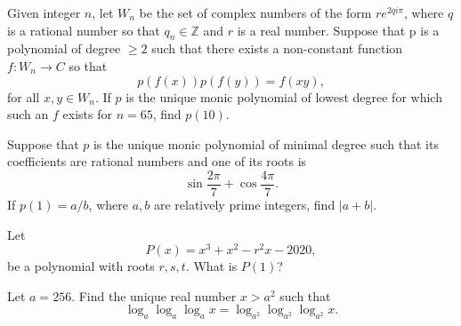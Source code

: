 \begin{question}[name={2020 PUMaC, Algebra, \href{https://artofproblemsolving.com/community/c4p23985025}{Problem A6/B8}}]
	Given integer $n$, let $W_n$ be the set of complex numbers of the form $re^{2qi\pi}$, where $q$ is a rational number so that $q_n \in \mathbb Z$ and $r$ is a real number. Suppose that p is a polynomial of degree $ \ge 2$ such that there exists a non-constant function $f : W_n \to C$ so that $$p(f(x))p(f(y)) = f(xy),$$ for all $x, y \in W_n$. If $p$ is the unique monic polynomial of lowest degree for which such an $f$ exists for $n = 65$, find $p(10)$.
\end{question}


%	






\begin{question}[name={2020 PUMaC, Algebra, \href{https://artofproblemsolving.com/community/c4p23985027}{Problem A7}}]
	Suppose that $p$ is the unique monic polynomial of minimal degree such that its coefficients are rational numbers and one of its roots is $$\sin \frac{2\pi}{7} + \cos \frac{4\pi}{7}.$$ If $p(1) = {a}/{b}$, where $a, b$ are relatively prime integers, find $|a + b|$.
\end{question}


%	





\begin{question}[name={2020 HMMT, Algebra \& Number Theory, \href{https://artofproblemsolving.com/community/c4p14065028}{Problem 1}}]
	Let $$P(x)=x^3+x^2-r^2x-2020,$$ be a polynomial with roots $r,s,t$. What is $P(1)$?
\end{question}



%	






\begin{question}[name={2020 HMMT, Algebra \& Number Theory, \href{https://artofproblemsolving.com/community/c4p14065039}{Problem 3}}]
	Let $a=256$. Find the unique real number $x>a^2$ such that
	\[\log_a \log_a \log_a x = \log_{a^2} \log_{a^2} \log_{a^2} x.\]
\end{question}



